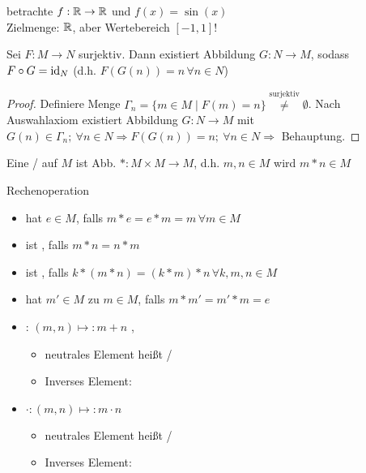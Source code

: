 \begin{example}
	betrachte $f:\mathbb{R}\to\mathbb{R}$ und $f(x)=\sin(x)$ \\
	Zielmenge: $\mathbb{R}$, aber Wertebereich $[-1,1]$!
\end{example}

\begin{proposition}
	Sei $F:M\rightarrow N$ surjektiv. Dann existiert Abbildung $G:N\rightarrow M$, sodass $F\circ G = \operatorname{id}_N$ (d.h. $F(G(n)) = n\,\forall n\in N$)
\end{proposition}

\begin{proof}
	Definiere Menge $\Gamma_n = \{m \in M \mid F(m) = n\} \overset{\text{surjektiv}}{\neq} \emptyset$. Nach Auswahlaxiom 	existiert Abbildung $G: N \to M$ mit $G(n) \in \Gamma_n;\ \forall n \in N \Rightarrow F(G(n)) = n;\ \forall n \in N 	\Rightarrow$ Behauptung.
\end{proof}



\begin{definition}[Verknüpfung]
	Eine  /  auf $M$ ist Abb. $*:M\times M\rightarrow M$, d.h. $m,n\in M$ wird  $m*n\in M$
	
	Rechenoperation
	\begin{itemize}
		\item hat  $e\in M$, falls $m*e = e*m = m\,\forall m\in M$
		\item ist , falls $m*n = n*m$
		\item ist , falls $k*(m*n) = (k*m)*n\,\forall k,m,n\in M$
		\item hat  $m'\in M$ zu $m\in M$, falls $m*m' = m'*m = e$
	\end{itemize}
\end{definition}

\begin{example}
	\begin{itemize}
		\item {}: $(m,n)\mapsto: m+n$ ,
		\begin{itemize}
			\item neutrales Element heißt  / 
			\item Inverses Element: 
		\end{itemize}
		\item {} $\cdot:(m,n)\mapsto: m\cdot n$ 
		\begin{itemize}
			\item neutrales Element heißt  / 
			\item Inverses Element:
		\end{itemize}
	\end{itemize}
\end{example}

